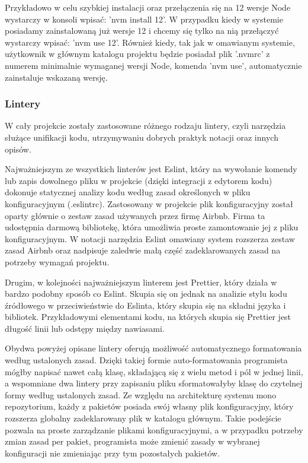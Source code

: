 Przykładowo w celu szybkiej instalacji oraz przełączenia się na 12 wersje Node wystarczy w konsoli wpisać: 'nvm install 12'. W przypadku kiedy w systemie posiadamy zainstalowaną już wersje 12 i chcemy się tylko na nią przełączyć wystarczy wpisać: 'nvm use 12'. Również kiedy, tak jak w omawianym systemie, użytkownik w głównym katalogu projektu będzie posiadał plik '.nvmrc' z numerem minimalnie wymaganej wersji Node, komenda 'nvm use', automatycznie zainstaluje wskazaną wersję.


\subsubsection{Lintery}
W cały projekcie zostały zastosowane różnego rodzaju lintery, czyli narzędzia służące unifikacji kodu, utrzymywaniu dobrych praktyk notacji oraz innych opisów.

Najważniejszym ze wszystkich linterów jest Eslint, który na wywołanie komendy lub zapis dowolnego pliku w projekcie (dzięki integracji z edytorem kodu) dokonuje statycznej analizy kodu według zasad określonych w pliku konfiguracyjnym (.eslintrc). Zastosowany w projekcie plik konfiguracyjny został oparty głównie o zestaw zasad używanych przez firmę Airbnb. Firma ta udostępnia darmową bibliotekę, która umożliwia proste zamontowanie jej z pliku konfiguracyjnym. W notacji narzędzia Eslint omawiany system rozszerza zestaw zasad Airbnb oraz nadpisuje zaledwie małą część zadeklarowanych zasad na potrzeby wymagań projektu.

Drugim, w kolejności najważniejszym linterem jest Prettier, który działa w bardzo podobny sposób co Eslint. Skupia się on jednak na analizie stylu kodu źródłowego w przeciwieństwie do Eslinta, który skupia się na składni języka i bibliotek. Przykładowymi elementami kodu, na których skupia się Prettier jest długość linii lub odstępy między nawiasami.

Obydwa powyżej opisane lintery oferują możliwość automatycznego formatowania według ustalonych zasad. Dzięki takiej formie auto-formatowania programista mógłby napisać nawet całą klasę, składającą się z wielu metod i pól w jednej linii, a wspomniane dwa lintery przy zapisaniu pliku sformatowałyby klasę do czytelnej formy według ustalonych zasad. Ze względu na architekturę systemu mono repozytorium, każdy z pakietów posiada swój własny plik konfiguracyjny, który rozszerza globalny zadeklarowany plik w katalogu głównym. Takie podejście pozwala na proste zarządzanie plikami konfiguracyjnymi, a w przypadku potrzeby zmian zasad per pakiet, programista może zmienić zasady w wybranej konfiguracji nie zmieniając przy tym pozostałych pakietów.

